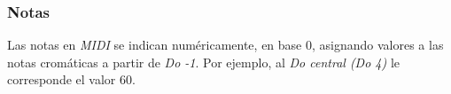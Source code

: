 \subsubsection{Notas}

Las notas en \textit{MIDI} se indican numéricamente, en base 0, asignando valores a las notas cromáticas a partir de \textit{Do -1}. Por ejemplo, al \textit{Do central (Do 4)} le corresponde el valor 60.

\clearpage{\cleardoublepage}
\clearpage{\pagestyle{empty}\cleardoublepage}
